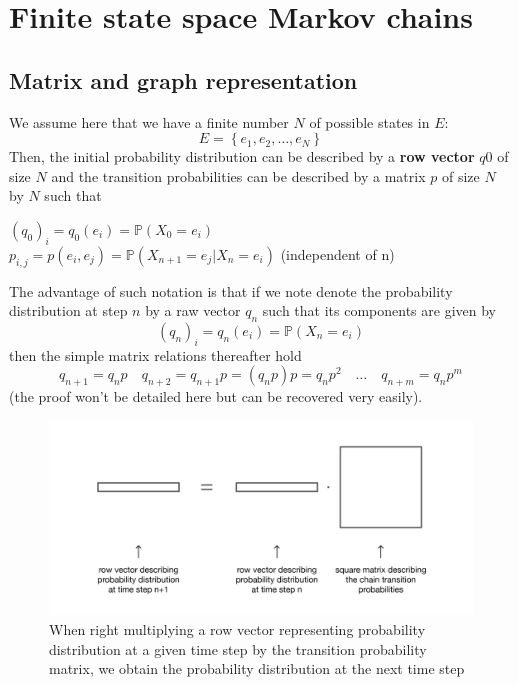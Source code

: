\section{Finite state space Markov chains}
\subsection{Matrix and graph representation}

We assume here that we have a finite number $N$ of possible states in $E$:
\begin{equation}E=\left\{e_{1}, e_{2}, \dots, e_{N}\right\}\end{equation}
Then, the initial probability distribution can be described by a \textbf{row vector} $q0$ of size $N$ and the transition probabilities can be described by a matrix $p$ of size $N$ by $N$ such that

$\left(q_{0}\right)_{i}=q_{0}\left(e_{i}\right)=\mathbb{P}\left(X_{0}=e_{i}\right)$\\
$p_{i, j}=p\left(e_{i}, e_{j}\right)=\mathbb{P}\left(X_{n+1}=e_{j} | X_{n}=e_{i}\right)$
(independent of n)

The advantage of such notation is that if we note denote the probability distribution at step $n$ by a raw vector $q_n$ such that its components are given by
\begin{equation}
\left(q_{n}\right)_{i}=q_{n}\left(e_{i}\right)=\mathbb{P}\left(X_{n}=e_{i}\right)
\end{equation}
then the simple matrix relations thereafter hold
\begin{equation}
q_{n+1}=q_{n} p \quad q_{n+2}=q_{n+1} p=\left(q_{n} p\right) p=q_{n} p^{2} \quad \ldots \quad q_{n+m}=q_{n} p^{m}
\end{equation}
(the proof won't be detailed here but can be recovered very easily).

\begin{figure}[h]
    \centering
\includegraphics[width=\textwidth]{pic/p05c07-snip03.png}
    \caption[Obtain the probability distribution for the next time step]{When right multiplying a row vector representing probability distribution at a given time step by the transition probability matrix, we obtain the probability distribution at the next time step}
    \label{fig:p05c07-snip03}
\end{figure}

